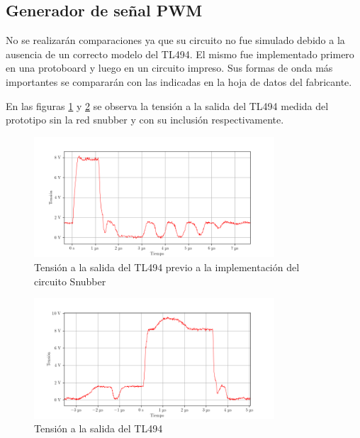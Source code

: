 

\subsection{Generador de señal PWM}

No se realizarán comparaciones ya que su circuito no fue simulado debido a la ausencia de un correcto modelo del TL494.
El mismo fue implementado primero en una protoboard y luego en un circuito impreso.
Sus formas de onda más importantes se compararán con las indicadas en la hoja de datos del fabricante.

En las figuras \ref{fig:osc_pwm_vout_no_snubber} y \ref{fig:osc_pwm_vout_disconnected} se observa la tensión a la salida del TL494 medida del prototipo sin la red snubber y con su inclusión respectivamente.

\begin{figure}[H]
    \centering
    \includegraphics[width=0.8\textwidth]{images/capturas-osciloscopio/TL494/pwm_vout_connected.png}
    \caption{Tensión a la salida del TL494 previo a la implementación del circuito Snubber}
    \label{fig:osc_pwm_vout_no_snubber}
\end{figure}

\begin{figure}[H]
    \centering
    \includegraphics[width=0.8\textwidth]{images/capturas-osciloscopio/17-11-2022/1.png}
    \caption{Tensión a la salida del TL494}
    \label{fig:osc_pwm_vout_disconnected}
\end{figure}

